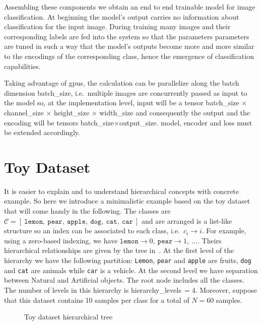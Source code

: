 Assembling these components we obtain an end to end trainable model for image classification. At beginning the model's output carries no information about classification for the input image. During training many images and their corresponding labels are fed into the system so that the parameters \gls{parameters} are tuned in such a way that the model's outputs become more and more similar to the encodings of the corresponding class, hence the emergence of classification capabilities.

Taking advantage of \acrshort{gpu}s, the calculation can be parallelize along the batch dimension \gls{batch_size}, i.e.\ multiple images are concurrently passed as input to the model so, at the implementation level, \gls{input} will be a tensor \gls{batch_size} $\times$ \gls{channel_size} $\times$ \gls{height_size} $\times$ \gls{width_size} and consequently the output and the encoding will be tensors \gls{batch_size}$\times$\gls{output_size}. \gls{model}, \gls{encoder} and \gls{loss} must be extended accordingly.


\section{Toy Dataset}
\label{sec:toy-dataset}

It is easier to explain and to understand hierarchical concepts with concrete example. So here we introduce a minimalistic example based on the toy dataset that will come handy in the following. The classes are $\mathcal{C} = [\ \texttt{lemon},\ \texttt{pear},\ \texttt{apple},\ \texttt{dog},\ \texttt{cat},\ \texttt{car}\ ]$ and are arranged is a list-like structure so an index can be associated to each class, i.e.\ $c_i \to i$.
For example, using a zero-based indexing, we have $\texttt{lemon} \to 0,\ \texttt{pear} \to 1,\ \ldots$. Theirs hierarchical relationships are given by the tree in~. At the first level of the hierarchy we have the following partition: \texttt{Lemon}, \texttt{pear} and \texttt{apple} are fruits, \texttt{dog} and \texttt{cat} are animals while \texttt{car} is a vehicle. At the second level we have separation between Natural and Artificial objects. The root node includes all the classes. The number of levels in this hierarchy is \gls{hierarchy_levels}$\,=4$. Moreover, suppose that this dataset contains 10 samples per class for a total of $N = 60$ samples.
\begin{figure}[htbp]
  \caption{Toy dataset hierarchical tree}
  \label{fig:03/toy-dataset}
\end{figure}

